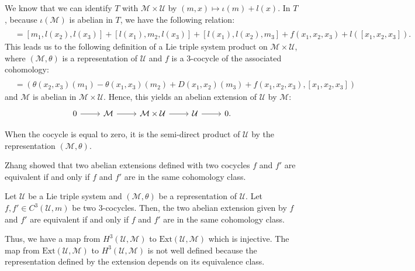 \documentclass[11pt, twoside]{article}
\begin{document}
We know that we can identify $T$ with $\mathcal{M}\times \mathcal{U} $ by $(m,x)\mapsto \iota(m)+l(x) $. In $T$, because $\iota(\mathcal{M}) $ is abelian in $T$, we have the following relation: \begin{align*}
    [m_1+&l(x_1),m_2+l(x_2),m_3+l(x_3)] \\ &=[m_1,l(x_2),l(x_3)] + [l(x_1),m_2,l(x_3)]+[l(x_1),l(x_2),m_3]+ f(x_1,x_2,x_3)+l([x_1,x_2,x_3]).
\end{align*} This leads us to the following definition of a Lie triple system product on $\mathcal{M}\times \mathcal{U} $, where $(\mathcal{M},\theta)$ is a representation of $\mathcal{U}$ and $f$ is a $3$-cocycle of the associated cohomology: \begin{align*}
    [(m_1,x_1)&,(m_2,x_2),(m_3,x_3)] \\ &= (\theta(x_2,x_3)(m_1)- \theta(x_1,x_3)(m_2)+D(x_1,x_2)(m_3)+f(x_1,x_2,x_3),[x_1,x_2,x_3])
\end{align*} and $
\mathcal{M}$ is abelian in $\mathcal{M}\times \mathcal{U} $. Hence, this yields an abelian extension of $\mathcal{U}$ by $\mathcal{M}$: \[\begin{tikzcd}
	0 & \mathcal{M} & {\mathcal{M}\times\mathcal{U}} & {\mathcal{U}} & 0.
	\arrow[from=1-1, to=1-2]
	\arrow[from=1-2, to=1-3]
	\arrow[from=1-3, to=1-4]
	\arrow[from=1-4, to=1-5]
\end{tikzcd}\]

\begin{rmq}
    When the cocycle is equal to zero, it is the semi-direct product of $\mathcal{U}$ by the representation $(\mathcal{M},\theta)$.
\end{rmq}

Zhang showed that two abelian extensions defined with two cocycles $f $ and $f'$ are equivalent if and only if $f$ and $f'$ are in the same cohomology class.

\begin{lem}\cite{Z14}
    Let $\mathcal{U} $ be a Lie triple system and $(\mathcal{M},\theta) $ be a representation of $\mathcal{U}$. Let $f,f'\in C^3(\mathcal{U},m) $ be two $3$-cocycles. Then, the two abelian extension given by $f$ and $f'$ are equivalent if and only if $f$ and $f'$ are in the same cohomology class.
\end{lem}

Thus, we have a map from $H^3(\mathcal{U},\mathcal{M}) $ to $\mathrm{Ext}(\mathcal{U},\mathcal{M}) $ which is injective. The map from $\mathrm{Ext}(\mathcal{U},\mathcal{M}) $ to $H^3(\mathcal{U},\mathcal{M}) $ is not well defined because the representation defined by the extension depends on its equivalence class. 
\end{document}

